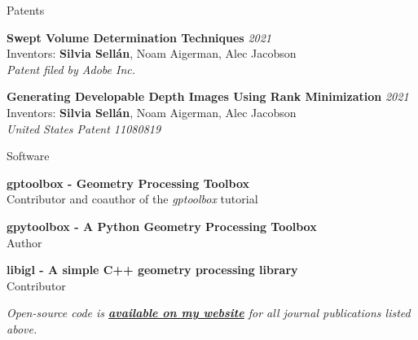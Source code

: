 \documentclass{resume}
\newcommand{\software}[2]{
    {\bf #1}\\ 
    {\small#2 }}
\newcommand{\patent}[5]{
    {\bf #1} \hfill {\em \small #2} \\ %
    {\small Inventors: #3}{\small \bf Silvia Sell\'{a}n}{\small #4} \\ %
    {\small \it #5} %
}
\begin{document}
\begin{rSection}{Patents}

\patent{Swept Volume Determination Techniques}{2021}{}{, Noam Aigerman, Alec Jacobson}{Patent filed by Adobe Inc.}

\patent{Generating Developable Depth Images Using Rank Minimization}{2021}{}{, Noam Aigerman, Alec Jacobson}{United States Patent 11080819}


\end{rSection}

\begin{rSection}{Software}

\software{gptoolbox - Geometry Processing Toolbox}{Contributor and coauthor of the \textit{gptoolbox} tutorial}

\software{gpytoolbox - A Python Geometry Processing Toolbox}{Author}

\software{libigl - A simple C++ geometry processing library}{Contributor}


\textit{Open-source code is \href{http://dgp.toronto.edu/~sgsellan/}{\textbf{available on my website}} for all journal publications listed above.}

\end{rSection}
\end{document}
